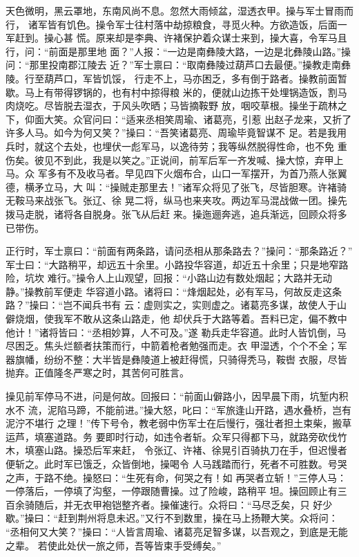 天色微明，黑云罩地，东南风尚不息。忽然大雨倾盆，湿透衣甲。操与军士冒雨而行，
诸军皆有饥色。操令军士往村落中劫掠粮食，寻觅火种。方欲造饭，后面一军赶到。操心甚
慌。原来却是李典、许褚保护着众谋士来到，操大喜，令军马且行，问：“前面是那里地
面？”人报：“一边是南彝陵大路，一边是北彝陵山路。”操问：“那里投南郡江陵去
近？”军士禀曰：“取南彝陵过葫芦口去最便。”操教走南彝陵。行至葫芦口，军皆饥馁，
行走不上，马亦困乏，多有倒于路者。操教前面暂歇。马上有带得锣锅的，也有村中掠得粮
米的，便就山边拣干处埋锅造饭，割马肉烧吃。尽皆脱去湿衣，于风头吹晒；马皆摘鞍野
放，咽咬草根。操坐于疏林之下，仰面大笑。众官问曰：“适来丞相笑周瑜、诸葛亮，引惹
出赵子龙来，又折了许多人马。如今为何又笑？”操曰：“吾笑诸葛亮、周瑜毕竟智谋不
足。若是我用兵时，就这个去处，也埋伏一彪军马，以逸待劳；我等纵然脱得性命，也不免
重伤矣。彼见不到此，我是以笑之。”正说间，前军后军一齐发喊、操大惊，弃甲上马。众
军多有不及收马者。早见四下火烟布合，山口一军摆开，为首乃燕人张翼德，横矛立马，大
叫：“操贼走那里去！”诸军众将见了张飞，尽皆胆寒。许褚骑无鞍马来战张飞。张辽、徐
晃二将，纵马也来夹攻。两边军马混战做一团。操先拨马走脱，诸将各自脱身。张飞从后赶
来。操迤逦奔逃，追兵渐远，回顾众将多已带伤。

正行时，军士禀曰：“前面有两条路，请问丞相从那条路去？”操问：“那条路近？”
军士曰：“大路稍平，却远五十余里。小路投华容道，却近五十余里；只是地窄路险，坑坎
难行。”操令人上山观望，回报：“小路山边有数处烟起；大路并无动静。”操教前军便走
华容道小路。诸将曰：“烽烟起处，必有军马，何故反走这条路？”操曰：“岂不闻兵书有
云：虚则实之，实则虚之。诸葛亮多谋，故使人于山僻烧烟，使我军不敢从这条山路走，他
却伏兵于大路等着。吾料已定，偏不教中他计！”诸将皆曰：“丞相妙算，人不可及。”遂
勒兵走华容道。此时人皆饥倒，马尽困乏。焦头烂额者扶策而行，中箭着枪者勉强而走。衣
甲湿透，个个不全；军器旗幡，纷纷不整：大半皆是彝陵道上被赶得慌，只骑得秃马，鞍辔
衣服，尽皆抛弃。正值隆冬严寒之时，其苦何可胜言。

操见前军停马不进，问是何故。回报曰：“前面山僻路小，因早晨下雨，坑堑内积水不
流，泥陷马蹄，不能前进。”操大怒，叱曰：“军旅逢山开路，遇水叠桥，岂有泥泞不堪行
之理！”传下号令，教老弱中伤军士在后慢行，强壮者担土束柴，搬草运芦，填塞道路。务
要即时行动，如违令者斩。众军只得都下马，就路旁砍伐竹木，填塞山路。操恐后军来赶，
令张辽、许褚、徐晃引百骑执刀在手，但迟慢者便斩之。此时军已饿乏，众皆倒地，操喝令
人马践踏而行，死者不可胜数。号哭之声，于路不绝。操怒曰：“生死有命，何哭之有！如
再哭者立斩！”三停人马：一停落后，一停填了沟壑，一停跟随曹操。过了险峻，路稍平
坦。操回顾止有三百余骑随后，并无衣甲袍铠整齐者。操催速行。众将曰：“马尽乏矣，只
好少歇。”操曰：“赶到荆州将息未迟。”又行不到数里，操在马上扬鞭大笑。众将问：
“丞相何又大笑？”操曰：“人皆言周瑜、诸葛亮足智多谋，以吾观之，到底是无能之辈。
若使此处伏一旅之师，吾等皆束手受缚矣。”

